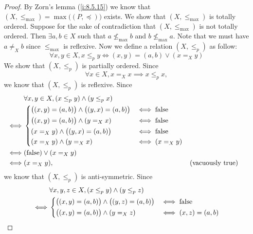 \begin{proof}
  By Zorn's lemma (\cref{i:8.5.15}) we know that \((X, \leq_{\max}) = \max\big((P, \preceq)\big)\) exists.
  We show that \((X, \leq_{\max})\) is totally ordered.
  Suppose for the sake of contradiction that \((X, \leq_{\max})\) is not totally ordered.
  Then \(\exists a, b \in X\) such that \(a \not\leq_{\max} b\) and \(b \not\leq_{\max} a\).
  Note that we must have \(a \neq_X b\) since \(\leq_{\max}\) is reflexive.
  Now we define a relation \((X, \leq_p)\) as follow:
  \[
    \forall x, y \in X, x \leq_p y \iff (x, y) = (a, b) \lor (x =_X y)
  \]
  We show that \((X, \leq_p)\) is partially ordered.
  Since
  \[
    \forall x \in X, x =_X x \implies x \leq_p x,
  \]
  we know that \((X, \leq_p)\) is reflexive.
  Since
  \begin{align*}
         & \forall x, y \in X, (x \leq_p y) \land (y \leq_p x)                                                           \\
    \iff & \begin{dcases}
             \big((x, y) = (a, b)\big) \land \big((y, x) = (a, b)\big) & \iff \text{false} \\
             \big((x, y) = (a, b)\big) \land (y =_X x)                 & \iff \text{false} \\
             (x =_X y) \land \big((y, x) = (a, b)\big)                 & \iff \text{false} \\
             (x =_X y) \land (y =_X x)                                 & \iff (x =_X y)
           \end{dcases}                                 \\
    \iff & (\text{false}) \lor (x =_X y)                                                                                 \\
    \iff & (x =_X y),                                                                       &  & \text{(vacuously true)}
  \end{align*}
  we know that \((X, \leq_p)\) is anti-symmetric.
  Since
  \begin{align*}
         & \forall x, y, z \in X, (x \leq_p y) \land (y \leq_p z)                                                           \\
    \iff & \begin{dcases}
             \big((x, y) = (a, b)\big) \land \big((y, z) = (a, b)\big) & \iff \text{false}    \\
             \big((x, y) = (a, b)\big) \land (y =_X z)                 & \iff (x, z) = (a, b) \\

\end{dcases}
\end{align*}
\end{proof}
